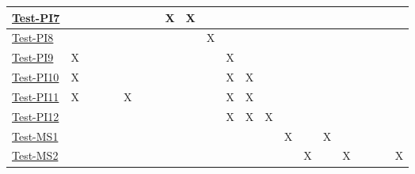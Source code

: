 \documentclass[12pt, titlepage]{article}
\begin{document}
\begin{landscape}
\begin{table}[H]
\begin{adjustwidth}{-0.1in}{-1in}
{\begin{tabular}{|c|c|c|c|c|c|c|c|c|c|c|c|c|c|c|c|c|c|c|c|c|c|}
\multicolumn{1}{|l|}{\hyperref[itm:Test-PI8]{Test-PI7}}   &             &              &             &             &             &             &              &X              &X             &             &              &             &              &                & & & & & & &\\ \hline
\multicolumn{1}{|l|}{\hyperref[itm:Test-PI9]{Test-PI8}}   &             &              &             &             &             &             &              &              &             &X             &              &             &              &                & & & & & & &\\ \hline
\multicolumn{1}{|l|}{\hyperref[itm:Test-PI10]{Test-PI9}}   &X             &              &             &             &             &             &              &              &             &             &X              &             &              &                & & & & & & &\\ \hline
\multicolumn{1}{|l|}{\hyperref[itm:Test-PI11]{Test-PI10}}   &X             &              &             &             &             &             &              &              &             &             &X              &X             &              &                & & & & & & &\\ \hline
\multicolumn{1}{|l|}{\hyperref[itm:Test-PI12]{Test-PI11}}   &X             &              &             &             &X             &             &              &              &             &             &X              &X             &              &                & & & & & & &\\ \hline
\multicolumn{1}{|l|}{\hyperref[itm:Test-PI13]{Test-PI12}}   &             &              &             &             &             &             &              &              &             &             &X              &X             &X              &                & & & & & & &\\ \hline
\multicolumn{1}{|l|}{\hyperref[itm:Test-MS1]{Test-MS1}}   &             &              &             &             &             &             &              &              &             &             &              &             &              &X                & &X & & & & &\\ \hline
\multicolumn{1}{|l|}{\hyperref[itm:Test-MS2]{Test-MS2}}   &             &              &             &             &             &             &              &              &             &             &              &             &              &                &X & &X & & & &X\\ \hline

\end{tabular}}
\end{adjustwidth}
\end{table}
\end{landscape}
\end{document}
